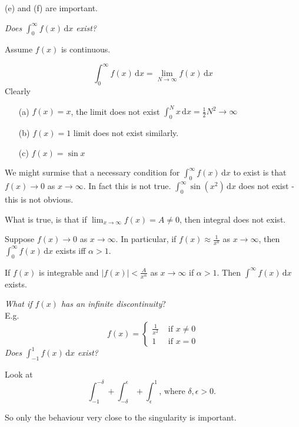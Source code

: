 \documentclass[10pt]{scrartcl}
\begin{document}
(e) and (f) are important. 


\emph{Does $\int_0^{\infty} f(x)\,\mathrm{d}x$ exist?} 

Assume $f(x)$ is continuous. 

\[\int_0^{\infty} f(x)\,\mathrm{d}x = \lim_{N \to \infty} f(x)\,\mathrm{d}x\]
Clearly 
\begin{itemize}
  \item[(a)] $f(x) = x$, the limit does not exist $\int_0^N x\,\mathrm{d}x = \frac{1}{2}N^2 \to \infty$
  \item[(b)] $f(x) = 1$ limit does not exist similarly.
 \item[(c)] $f(x) = \sin x$ 
\end{itemize}\vspace*{5pt}

We might surmise that a necessary condition for $\int_0^{\infty} f(x)\,\mathrm{d}x$ to exist is that $f(x) \to 0$ as $x \to \infty$. In fact this is not true. $\int_0^{\infty} \sin(x^2)\,\mathrm{d}x$ does not exist - this is not obvious. 

What is true, is that if $\lim_{x \to \infty} f(x) = A \neq 0$, then integral does not exist. 

Suppose $f(x) \to 0$ as $x \to \infty$. In particular, if $f(x) \approx \frac{1}{x^a}$ as $x \to \infty$, then $\int_0^{\infty} f(x)\, \mathrm{d}x$ exists iff $\alpha > 1$.\\

\begin{theorem} If $f(x)$ is integrable and $|f(x)| < \frac{A}{x^{\alpha}}$ as $x \to \infty$ if $\alpha > 1$. Then $\int^{\infty} f(x)\, \mathrm{d}x$ exists. 
\end{theorem}

\emph{What if $f(x)$ has an infinite discontinuity}?\\

E.g. \[f(x) = \begin{cases}
 \frac{1}{x^2} & \mbox{ if $x \neq 0$}\\
 1 & \mbox{ if $x = 0$}	
 \end{cases}
\]	
\emph{Does $\displaystyle{\int_{-1}^1 f(x)\,\mathrm{d}x}$ exist?}

Look at 
\[\int_{-1}^{-\delta} + \int_{-\delta}^{\epsilon} + \int_{\epsilon}^1 \mbox{, where $\delta, \epsilon >0$. 
}\]

So only the behaviour very close to the singularity is important.\\
\end{document}
